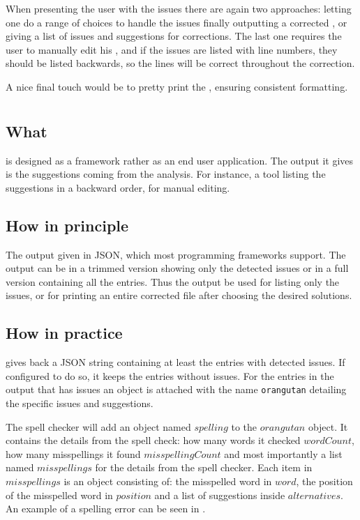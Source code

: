 When presenting the user with the issues there are again two
approaches: letting one do a range of choices to handle the issues
finally outputting a corrected , or giving a list of issues
and suggestions for corrections.  The last one requires the user to
manually edit his , and if the issues are listed with line
numbers, they should be listed backwards, so the lines will be correct
throughout the correction.

A nice final touch would be to pretty print the , ensuring
consistent formatting.


\section{\orangutan}

\subsection{What}

{\orangutan} is designed as a framework rather as an end user
application.  The output it gives is the suggestions coming from the
analysis.  For instance, a tool listing the suggestions in a backward
order, for manual editing.


\subsection{How in principle}

The output given in JSON, which most programming frameworks support.
The output can be in a trimmed version showing only the detected
issues or in a full version containing all the entries.  Thus the
output be used for listing only the issues, or for printing an entire
corrected {\bibtex} file after choosing the desired solutions.


\subsection{How in practice}

{\orangutan} gives back a JSON string containing at least the entries
with detected issues.  If configured to do so, it keeps the entries
without issues.  For the entries in the output that has issues an
object is attached with the name \texttt{orangutan} detailing the
specific issues and suggestions.

The spell checker will add an object named $spelling$ to the
$orangutan$ object.  It contains the details from the spell check: how
many words it checked $wordCount$, how many misspellings it found
$misspellingCount$ and most importantly a list named $misspellings$
for the details from the spell checker.  Each item in $misspellings$
is an object consisting of: the misspelled word in $word$, the
position of the misspelled word in $position$ and a list of
suggestions inside $alternatives$.  An example of a spelling error can
be seen in .

